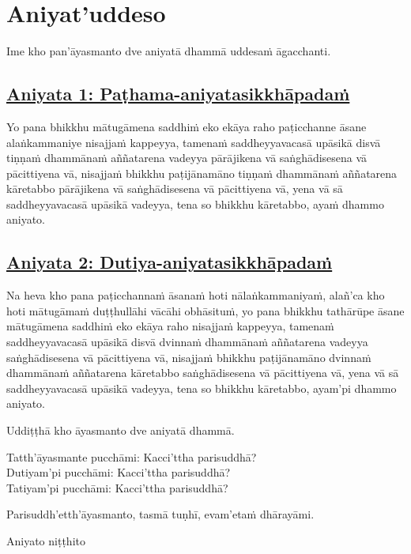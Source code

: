 \section{Aniyat'uddeso}
\label{aniy}

\begin{intro}
  Ime kho pan'āyasmanto dve aniyatā dhammā uddesaṁ āgacchanti.
\end{intro}

\subsection*{\hyperref[unc1]{Aniyata 1: Paṭhama-aniyatasikkhāpadaṁ}}
\label{aniy1}
Yo pana bhikkhu mātugāmena saddhiṁ eko ekāya raho paṭicchanne āsane alaṅkammaniye nisajjaṁ kappeyya, tamenaṁ saddheyyavacasā upāsikā disvā tiṇṇaṁ dhammānaṁ aññatarena vadeyya pārājikena vā saṅghādisesena vā pācittiyena vā, nisajjaṁ bhikkhu paṭijānamāno tiṇṇaṁ dhammānaṁ aññatarena kāretabbo pārājikena vā saṅghādisesena vā pācittiyena vā, yena vā sā saddheyyavacasā upāsikā vadeyya, tena so bhikkhu kāretabbo, ayaṁ dhammo aniyato.

\subsection*{\hyperref[unc2]{Aniyata 2: Dutiya-aniyatasikkhāpadaṁ}}
\label{aniy2}
Na heva kho pana paṭicchannaṁ āsanaṁ hoti nālaṅkammaniyaṁ, alañ'ca kho hoti mātugāmaṁ duṭṭhullāhi vācāhi obhāsituṁ, yo pana bhikkhu tathārūpe āsane mātugāmena saddhiṁ eko ekāya raho nisajjaṁ kappeyya, tamenaṁ saddheyyavacasā upāsikā disvā dvinnaṁ dhammānaṁ aññatarena vadeyya saṅghādisesena vā pācittiyena vā, nisajjaṁ bhikkhu paṭijānamāno dvinnaṁ dhammānaṁ aññatarena kāretabbo saṅghādisesena vā pācittiyena vā, yena vā sā saddheyyavacasā upāsikā vadeyya, tena so bhikkhu kāretabbo, ayam'pi dhammo aniyato.

\medskip

\begin{center}
Uddiṭṭhā kho āyasmanto dve aniyatā dhammā.

\smallskip

Tatth'āyasmante pucchāmi: Kacci'ttha parisuddhā?\\
Dutiyam'pi pucchāmi: Kacci'ttha parisuddhā?\\
Tatiyam'pi pucchāmi: Kacci'ttha parisuddhā?

\smallskip

Parisuddh'etth'āyasmanto, tasmā tuṇhī, evam'etaṁ dhārayāmi.
\end{center}

\begin{outro}
  Aniyato niṭṭhito
\end{outro}

\clearpage
